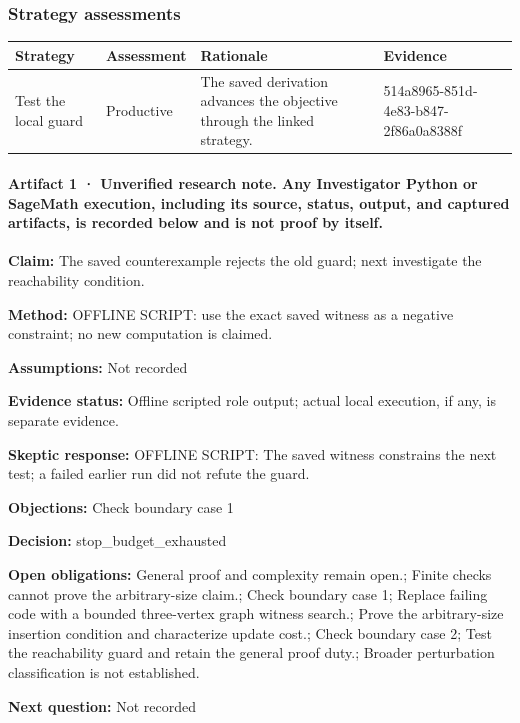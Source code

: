 \documentclass[11pt]{article}
\begin{document}
\subsubsection*{Strategy assessments}
\begin{longtable}{>{\raggedright\arraybackslash}p{.16\linewidth}>{\raggedright\arraybackslash}p{.15\linewidth}>{\raggedright\arraybackslash}p{.40\linewidth}>{\raggedright\arraybackslash}p{.17\linewidth}}
\toprule Strategy & Assessment & Rationale & Evidence \\
\midrule\endhead
Test the local guard & Productive & The saved derivation advances the objective through the linked strategy. & 514a8965-851d-4e83-b847-2f86a0a8388f \\
\bottomrule
\end{longtable}
\paragraph{Artifact 1 · Unverified research note. Any Investigator Python or SageMath execution, including its source, status, output, and captured artifacts, is recorded below and is not proof by itself.}
\textbf{Claim:} The saved counterexample rejects the old guard; next investigate the reachability condition.\par
\textbf{Method:} OFFLINE SCRIPT: use the exact saved witness as a negative constraint; no new computation is claimed.\par
\textbf{Assumptions:} Not recorded\par
\textbf{Evidence status:} Offline scripted role output; actual local execution, if any, is separate evidence.\par
\textbf{Skeptic response:} OFFLINE SCRIPT: The saved witness constrains the next test; a failed earlier run did not refute the guard.\par
\textbf{Objections:} Check boundary case 1\par
\textbf{Decision:} stop\_budget\_exhausted\par
\textbf{Open obligations:} General proof and complexity remain open.; Finite checks cannot prove the arbitrary-size claim.; Check boundary case 1; Replace failing code with a bounded three-vertex graph witness search.; Prove the arbitrary-size insertion condition and characterize update cost.; Check boundary case 2; Test the reachability guard and retain the general proof duty.; Broader perturbation classification is not established.\par
\textbf{Next question:} Not recorded\par
\end{document}
